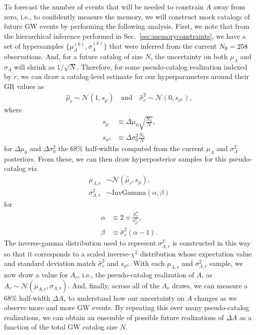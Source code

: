\documentclass[aps,prd,reprint,twocolumn,10pt,eqsecnum,showpacs,nofootinbib,amsfonts,amssymb,amsmath,longbibliography,superscriptaddress,floatfix]{revtex4-1}
\begin{document}
To forecast the number of events that will be needed to constrain $A$ away from zero, i.e., to confidently measure the memory, we will construct mock catalogs of future GW events by performing the following analysis. First, we note that from the hierarchical inference performed in Sec.~\ref{sec:memoryconstraints}, we have a set of hypersamples $\{\mu_{\Lambda}^{(k)},\sigma_{\Lambda}^{(k)}\}$ that were inferred from the current $N_{0}=\text{258}$ observations. And, for a future catalog of size $N$, the uncertainty on both $\mu_{\Lambda}$ and $\sigma_{\Lambda}$ will shrink as $1/\sqrt{N}$. Therefore, for some pseudo-catalog realization indexed by $r$, we can draw a catalog-level estimate for our hyperparameters around their GR values as
\begin{align}
	\hat{\mu}_{r}\sim\mathcal{N}\left(1,s_{\mu}\right)\quad\text{and}\quad
	\hat{\sigma}_{r}^{2}\sim\mathcal{N}\left(0,s_{\sigma^{2}}\right),
\end{align}
where
\begin{subequations}
\begin{align}
	s_{\mu}&\equiv\Delta \mu_{0}\sqrt{\frac{N_{0}}{N}},\\
	s_{\sigma^{2}}&\equiv\Delta \sigma_{0}^{2}\frac{N_{0}}{N}
\end{align}
\end{subequations}
for $\Delta\mu_{0}$ and $\Delta\sigma_{0}^{2}$ the 68\% half-widths computed from the current $\mu_{\Lambda}$ and $\sigma_{\Lambda}^{2}$ posteriors. From these, we can then draw hyperposterior samples for this pseudo-catalog via
\begin{subequations}
\begin{align}
	\mu_{\Lambda,r}&\sim\mathcal{N}\left(\hat{\mu}_{r},s_{\mu}\right),\\
	\sigma_{\Lambda,r}^{2}&\sim\mathrm{InvGamma}\left(\alpha,\beta\right)
\end{align}
\end{subequations}
for
\begin{subequations}
\begin{align}
	\alpha&\equiv2+\frac{\hat{\sigma}_{r}^{4}}{s_{\sigma^{2}}^{2}},\\
	\beta&\equiv\hat{\sigma}_{r}^{2}(\alpha-1).
\end{align}
\end{subequations}
The inverse-gamma distribution used to represent $\sigma_{\Lambda,r}^{2}$ is constructed in this way so that it corresponds to a scaled inverse-$\chi^{2}$ distribution whose expectation value and standard deviation match $\hat{\sigma}_{r}^{2}$ and $s_{\sigma^{2}}$. With each $\mu_{\Lambda,r}$ and $\sigma_{\Lambda,r}^{2}$ sample, we now draw a value for $A_{r}$, i.e., the pseudo-catalog realization of $A$, as $A_{r}\sim\mathcal{N}\left(\mu_{\Lambda,r},\sigma_{\Lambda,r}\right)$. And, finally, across all of the $A_{r}$ draws, we can measure a 68\% half-width $\Delta A_{r}$ to understand how our uncertainty on $A$ changes as we observe more and more GW events. By repeating this over many pseudo-catalog realizations, we can obtain an ensemble of possible future realizations of $\Delta A$ as a function of the total GW catalog size $N$.
\end{document}
